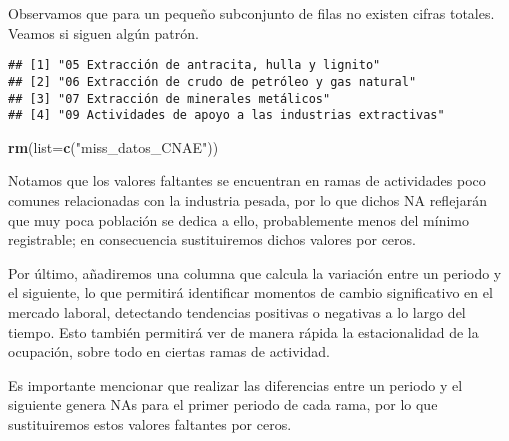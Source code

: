\documentclass[notspecified,article,submit,moreauthors,pdftex]{Definitions/mdpi}
\newenvironment{Shaded}{\begin{snugshade}}{\end{snugshade}}
\newcommand{\AttributeTok}[1]{\textcolor[rgb]{0.13,0.29,0.53}{#1}}
\newcommand{\ConstantTok}[1]{\textcolor[rgb]{0.56,0.35,0.01}{#1}}
\newcommand{\DecValTok}[1]{\textcolor[rgb]{0.00,0.00,0.81}{#1}}
\newcommand{\FloatTok}[1]{\textcolor[rgb]{0.00,0.00,0.81}{#1}}
\newcommand{\FunctionTok}[1]{\textcolor[rgb]{0.13,0.29,0.53}{\textbf{#1}}}
\newcommand{\NormalTok}[1]{#1}
\newcommand{\OtherTok}[1]{\textcolor[rgb]{0.56,0.35,0.01}{#1}}
\newcommand{\SpecialCharTok}[1]{\textcolor[rgb]{0.81,0.36,0.00}{\textbf{#1}}}
\newcommand{\StringTok}[1]{\textcolor[rgb]{0.31,0.60,0.02}{#1}}
\begin{document}
Observamos que para un pequeño subconjunto de filas no existen cifras
totales. Veamos si siguen algún patrón.

\begin{Shaded}
\end{Shaded}

\begin{verbatim}
## [1] "05 Extracción de antracita, hulla y lignito"         
## [2] "06 Extracción de crudo de petróleo y gas natural"    
## [3] "07 Extracción de minerales metálicos"                
## [4] "09 Actividades de apoyo a las industrias extractivas"
\end{verbatim}

\begin{Shaded}
\begin{Highlighting}[]
\FunctionTok{rm}\NormalTok{(}\AttributeTok{list=}\FunctionTok{c}\NormalTok{(}\StringTok{"miss\_datos\_CNAE"}\NormalTok{))}
\end{Highlighting}
\end{Shaded}

Notamos que los valores faltantes se encuentran en ramas de actividades
poco comunes relacionadas con la industria pesada, por lo que dichos NA
reflejarán que muy poca población se dedica a ello, probablemente menos
del mínimo registrable; en consecuencia sustituiremos dichos valores por
ceros.

Por último, añadiremos una columna que calcula la variación entre un
periodo y el siguiente, lo que permitirá identificar momentos de cambio
significativo en el mercado laboral, detectando tendencias positivas o
negativas a lo largo del tiempo. Esto también permitirá ver de manera
rápida la estacionalidad de la ocupación, sobre todo en ciertas ramas de
actividad.

Es importante mencionar que realizar las diferencias entre un periodo y
el siguiente genera NAs para el primer periodo de cada rama, por lo que
sustituiremos estos valores faltantes por ceros.
\end{document}
